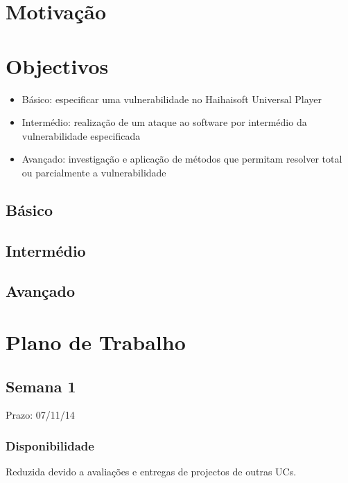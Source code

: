 \documentclass[a4paper]{article}
\begin{document}


\tableofcontents
\pagebreak

\section{Motivação}

\pagebreak

\section{Objectivos}
\label{sec:objectivos}

\begin{itemize}
	\item Básico: especificar uma vulnerabilidade no Haihaisoft Universal Player
	\item Intermédio: realização de um ataque ao software por intermédio da vulnerabilidade especificada
	\item Avançado: investigação e aplicação de métodos que permitam resolver total ou parcialmente a vulnerabilidade
\end{itemize}

\subsection{Básico}



\subsection{Intermédio}

\subsection{Avançado}

\pagebreak

\section{Plano de Trabalho}

\subsection{Semana 1}
Prazo: 07/11/14
\subsubsection{Disponibilidade}
Reduzida devido a avaliações e entregas de projectos de outras UCs.
\end{document}
